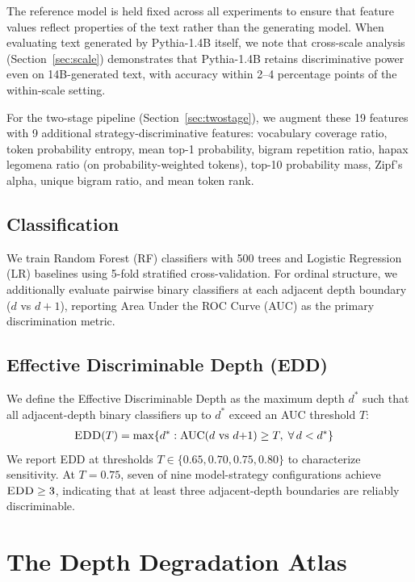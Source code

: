 \documentclass[11pt,a4paper]{article}
\newcommand{\edd}{\textsc{EDD}}
\begin{document}
The reference model is held fixed across all experiments to ensure that feature values reflect properties of the text rather than the generating model. When evaluating text generated by Pythia-1.4B itself, we note that cross-scale analysis (Section~\ref{sec:scale}) demonstrates that Pythia-1.4B retains discriminative power even on 14B-generated text, with accuracy within 2--4 percentage points of the within-scale setting.

For the two-stage pipeline (Section~\ref{sec:twostage}), we augment these 19 features with 9 additional strategy-discriminative features: vocabulary coverage ratio, token probability entropy, mean top-1 probability, bigram repetition ratio, hapax legomena ratio (on probability-weighted tokens), top-10 probability mass, Zipf's alpha, unique bigram ratio, and mean token rank.

\subsection{Classification}

We train Random Forest (RF) classifiers with 500 trees and Logistic Regression (LR) baselines using 5-fold stratified cross-validation. For ordinal structure, we additionally evaluate pairwise binary classifiers at each adjacent depth boundary ($d$ vs $d{+}1$), reporting Area Under the ROC Curve (AUC) as the primary discrimination metric.

\subsection{Effective Discriminable Depth (\edd)}
\label{sec:edd}

We define the Effective Discriminable Depth as the maximum depth $d^*$ such that all adjacent-depth binary classifiers up to $d^*$ exceed an AUC threshold $T$:
\begin{align}
    \edd(T) &= \max \{ d^* : \text{AUC}(d \text{ vs } d{+}1) \geq T, \; \forall \, d < d^* \}
\end{align}
We report \edd{} at thresholds $T \in \{0.65, 0.70, 0.75, 0.80\}$ to characterize sensitivity. At $T = 0.75$, seven of nine model-strategy configurations achieve $\edd \geq 3$, indicating that at least three adjacent-depth boundaries are reliably discriminable.

\section{The Depth Degradation Atlas}
\label{sec:atlas}
\end{document}
